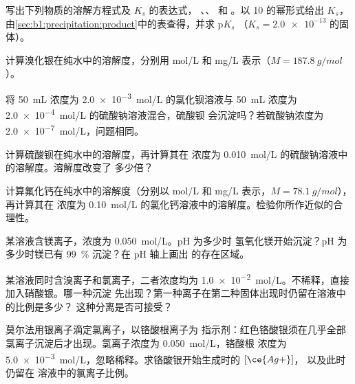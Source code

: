 \begin{exercise}[$\star$]\label{exo:b1:precipitation:1}
写出下列物质的溶解方程式及 $K_s$ 的表达式，
、、 和 。以 10 的幂形式给出 $K_s$，
由\cref{sec:b1:precipitation:product}中的表查得，并求 $\mathrm{p}K_s$
（$K_s = \num{2.0e-13}$ 的固体）。
\end{exercise}

\begin{exercise}[$\star$]\label{exo:b1:precipitation:2}
计算溴化银在纯水中的溶解度，分别用 \unit{mol/L}
和 \unit{mg/L} 表示（$M = \qty{187.8}{g/mol}$）。
\end{exercise}

\begin{exercise}[$\star$]\label{exo:b1:precipitation:3}
将 \qty{50}{mL} 浓度为 \qty{2.0e-3}{mol/L} 的氯化钡溶液与
\qty{50}{mL} 浓度为 \qty{2.0e-4}{mol/L} 的硫酸钠溶液混合，硫酸钡
会沉淀吗？若硫酸钠浓度为
\qty{2.0e-7}{mol/L}，问题相同。
\end{exercise}

\begin{exercise}[$\star$]\label{exo:b1:precipitation:4}
计算硫酸钡在纯水中的溶解度，再计算其在
浓度为 \qty{0.010}{mol/L} 的硫酸钠溶液中的溶解度。溶解度改变了
多少倍？
\end{exercise}

\begin{exercise}[$\star\star$]\label{exo:b1:precipitation:5}
计算氟化钙在纯水中的溶解度（分别以 \unit{mol/L} 和
\unit{mg/L} 表示，$M = \qty{78.1}{g/mol}$），再计算其在
浓度为 \qty{0.10}{mol/L} 的氯化钙溶液中的溶解度。检验你所作近似的合理性。
\end{exercise}

\begin{exercise}[$\star\star$]\label{exo:b1:precipitation:6}
某溶液含镁离子，浓度为 \qty{0.050}{mol/L}。pH 为多少时
氢氧化镁开始沉淀？pH 为多少时镁已有
\qty{99}{\percent} 沉淀？在 pH 轴上画出 
的存在区域。
\end{exercise}

\begin{exercise}[$\star\star$]\label{exo:b1:precipitation:7}
某溶液同时含溴离子和氯离子，二者浓度均为
\qty{1.0e-2}{mol/L}。不稀释，直接加入硝酸银。哪一种沉淀
先出现？第一种离子在第二种固体出现时仍留在溶液中的比例是多少？
这种分离是否可接受？
\end{exercise}

\begin{exercise}[$\star\star$]\label{exo:b1:precipitation:8}
莫尔法用银离子滴定氯离子，以铬酸根离子为
指示剂：红色铬酸银须在几乎全部
氯离子沉淀后才出现。氯离子浓度为 \qty{0.050}{mol/L}，铬酸根
浓度为 \qty{5.0e-3}{mol/L}，忽略稀释。求铬酸银开始生成时的 $[\ce{Ag+}]$，
以及此时仍留在
溶液中的氯离子比例。
\end{exercise}

